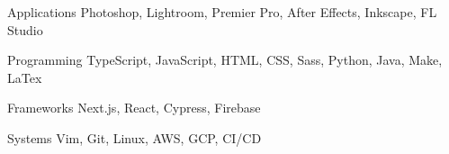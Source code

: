 

\begin{cvskills}

  \cvskill
    {Applications} %
    {Photoshop, Lightroom, Premier Pro, After Effects, Inkscape, FL Studio} %

  \cvskill
    {Programming} %
    {TypeScript, JavaScript, HTML, CSS, Sass, Python, Java, Make, LaTex} %

  \cvskill
    {Frameworks} %
    {Next.js, React, Cypress, Firebase} %

  \cvskill
    {Systems} %
    {Vim, Git, Linux, AWS, GCP, CI/CD} %

\end{cvskills}
